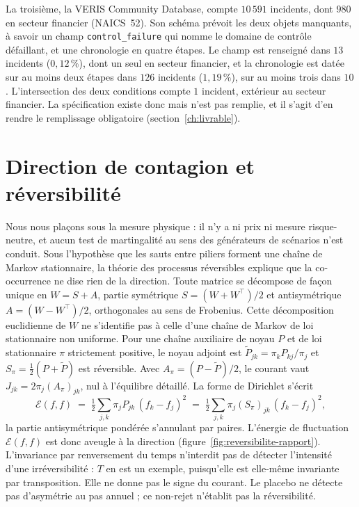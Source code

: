 La troisième, la VERIS Community Database, compte $10\,591$ incidents, dont $980$ en secteur
financier (NAICS~52). Son schéma prévoit les deux objets manquants, à savoir un champ
\texttt{control\_failure} qui nomme le domaine de contrôle défaillant, et une chronologie en quatre
étapes. Le champ est renseigné dans $13$ incidents ($0{,}12\,\%$), dont un seul en secteur financier,
et la chronologie est datée sur au moins deux étapes dans $126$ incidents ($1{,}19\,\%$), sur au moins
trois dans $10$. L'intersection des deux conditions compte $1$ incident, extérieur au secteur
financier. La spécification existe donc mais n'est pas remplie, et il s'agit d'en rendre le
remplissage obligatoire (section~\ref{ch:livrable}).




\section{Direction de contagion et réversibilité}

Nous nous plaçons sous la mesure physique : il n'y a ni prix ni mesure risque-neutre, et aucun test de
martingalité au sens des générateurs de scénarios n'est conduit. Sous l'hypothèse que les sauts entre
piliers forment une chaîne de Markov stationnaire, la théorie des processus réversibles explique que
la co-occurrence ne dise rien de la direction. Toute matrice se décompose de façon unique en
$W=S+A$, partie symétrique $S=(W+W^\top)/2$ et antisymétrique $A=(W-W^\top)/2$, orthogonales au sens
de Frobenius. Cette décomposition euclidienne de $W$ ne s'identifie pas à celle d'une chaîne de Markov de loi stationnaire non uniforme. Pour une chaîne auxiliaire de noyau $P$ et de loi stationnaire $\pi$ strictement positive, le noyau adjoint est $\tilde P_{jk} = \pi_k P_{kj}/\pi_j$ et $S_\pi=\tfrac12(P+\tilde
P)$ est réversible. Avec $A_\pi=(P-\tilde P)/2$, le courant vaut $J_{jk}=2\pi_j(A_\pi)_{jk}$, nul à l'équilibre détaillé. La forme de Dirichlet s'écrit
\begin{equation}
  \mathcal{E}(f,f) \;=\; \tfrac12\sum_{j,k}\pi_j P_{jk}\,(f_k-f_j)^2
                  \;=\; \tfrac12\sum_{j,k}\pi_j (S_\pi)_{jk}\,(f_k-f_j)^2 ,
  \label{eq:dirichlet}
\end{equation}
la partie antisymétrique pondérée s'annulant par paires. L'énergie de fluctuation $\mathcal{E}(f,f)$ est donc aveugle à la
direction (figure~\ref{fig:reversibilite-rapport}). L'invariance par renversement du temps n'interdit pas de détecter l'intensité d'une irréversibilité : $T$ en est un exemple, puisqu'elle est elle-même invariante par transposition. Elle ne donne pas le signe du courant. Le placebo ne détecte pas d'asymétrie au pas annuel ; ce non-rejet n'établit pas la réversibilité.

